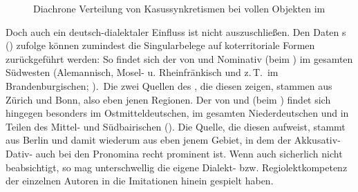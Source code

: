   
  \begin{figure} 
	\caption{Diachrone Verteilung von Kasussynkretismen bei vollen Objekten im }
	\label{histokasusNP}	
\end{figure}



Doch auch ein deutsch-dialektaler Einfluss ist nicht auszuschließen. Den Daten \citeauthor{Shrier1965}s (\citeyear{Shrier1965}) zufolge können zumindest die Singularbelege auf koterritoriale Formen zurückgeführt werden: So findet sich der  von  und Nominativ (beim {\Sg} {\mask}) im gesamten Südwesten (Alemannisch, Mosel- u. Rheinfränkisch und z.\,T.\, im Brandenburgischen; \citealt[423f]{Shrier1965}).\, Die zwei Quellen des , die diesen  zeigen, stammen aus Zürich und Bonn, also eben jenen Regionen. Der  von  und  (beim {\Sg} {\mask}) findet sich hingegen besonders im Ostmitteldeutschen, im gesamten Niederdeutschen und in Teilen des Mittel- und Südbairischen (\citealt[423f]{Shrier1965}). Die Quelle, die diesen  aufweist, stammt aus Berlin und damit wiederum aus eben jenem Gebiet, in dem der Akkusativ-Dativ- auch bei den Pronomina recht prominent ist. Wenn auch sicherlich nicht beabsichtigt, so mag unterschwellig die eigene Dialekt- bzw. Regiolektkompetenz der einzelnen Autoren in die Imitationen hinein gespielt haben.
 

